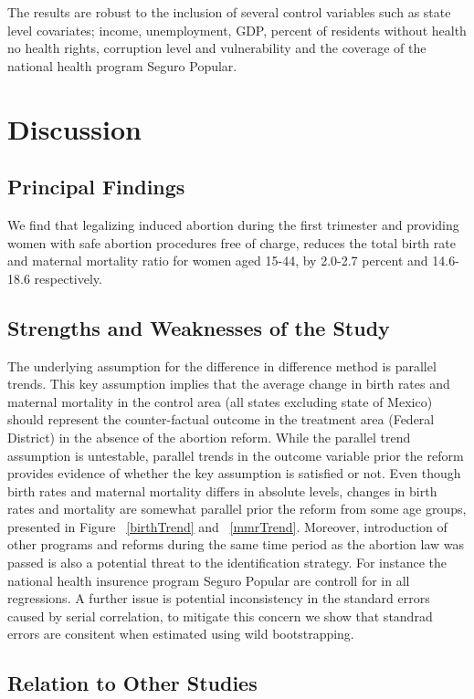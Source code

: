 \documentclass[a4paper, 11pt]{article}
\begin{document}
\begin{spacing}{1.5}
\begin{multicols}{2}
The results are robust to the inclusion of several control variables such as state level covariates; income, unemployment, GDP, percent of residents without health no health rights, corruption level and vulnerability and the coverage of the national health program Seguro Popular.  
\section{Discussion}
\subsection{Principal Findings}
We find that legalizing induced abortion during the first trimester and providing women with safe abortion procedures free of charge, reduces the total birth rate and maternal mortality ratio for women aged 15-44, by 2.0-2.7 percent and 14.6-18.6 respectively.   

\subsection{Strengths and Weaknesses of the Study}
 The underlying assumption for the difference in difference method is parallel trends. This key assumption implies that the average change in birth rates and maternal mortality in the control area (all states excluding state of Mexico) should represent the counter-factual outcome in the treatment area (Federal District) in the absence of the abortion reform. While the parallel trend assumption is untestable, parallel trends in the outcome variable prior the reform provides evidence of whether the key assumption is satisfied or not. Even though birth rates and maternal mortality differs in absolute levels, changes in birth rates and mortality are somewhat parallel prior the reform from some age groups, presented in Figure ~\ref{birthTrend} and  ~\ref{mmrTrend}. Moreover, introduction of other programs and reforms during the same time period as the abortion law was passed is also a potential threat to the identification strategy. For instance the national health insurence program Seguro Popular are controll for in all regressions. A further issue is potential inconsistency in the standard errors caused by serial correlation, to mitigate this concern we show that standrad errors are consitent when estimated using wild bootstrapping.  
\subsection{Relation to Other Studies}


\end{multicols}
\end{spacing}
\end{document}
